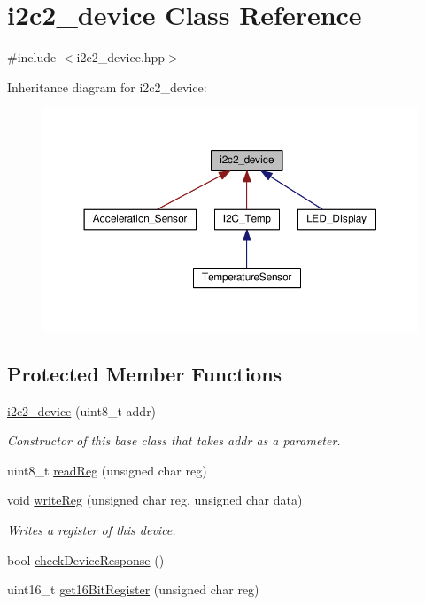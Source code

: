 \hypertarget{classi2c2__device}{}\section{i2c2\+\_\+device Class Reference}
\label{classi2c2__device}


{\ttfamily \#include $<$i2c2\+\_\+device.\+hpp$>$}



Inheritance diagram for i2c2\+\_\+device\+:\nopagebreak
\begin{figure}[H]
\begin{center}
\leavevmode
\includegraphics[width=350pt]{d3/d13/classi2c2__device__inherit__graph}
\end{center}
\end{figure}
\subsection*{Protected Member Functions}
\begin{DoxyCompactItemize}
\item 
\hyperlink{classi2c2__device_a8381947bf37d06a16d0fdfe904973de1}{i2c2\+\_\+device} (uint8\+\_\+t addr)
\begin{DoxyCompactList}\small\item\em Constructor of this base class that takes addr as a parameter. \end{DoxyCompactList}\item 
uint8\+\_\+t \hyperlink{classi2c2__device_a89abc70e5c1037bf4f15f5a50ec66291}{read\+Reg} (unsigned char reg)
\item 
void \hyperlink{classi2c2__device_a1c9fdc353d554833694222351187fca0}{write\+Reg} (unsigned char reg, unsigned char data)
\begin{DoxyCompactList}\small\item\em Writes a register of this device. \end{DoxyCompactList}\item 
bool \hyperlink{classi2c2__device_a9dc13487b2ce4f06459b3a814635020f}{check\+Device\+Response} ()
\item 
uint16\+\_\+t \hyperlink{classi2c2__device_aecd419069db41de482fa57e5c7ec7dc4}{get16\+Bit\+Register} (unsigned char reg)
\end{DoxyCompactItemize}


